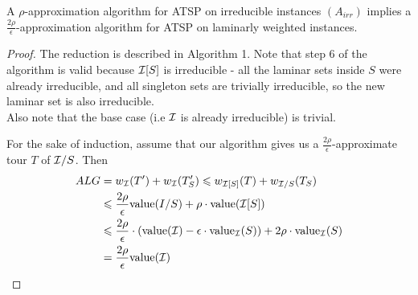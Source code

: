 \documentclass[./main.tex]{subfiles}
\begin{document}
	\begin{theorem}
		A $\rho$-approximation algorithm for ATSP on irreducible instances $(A_{irr})$ implies a $\frac{2\rho}{\epsilon}$-approximation algorithm for ATSP on laminarly weighted instances.
	\end{theorem}
	\begin{proof}
		The reduction is described in Algorithm 1. Note that step 6 of the algorithm is valid because $\mathcal{I}[S]$ is irreducible - all the laminar sets inside $S$ were already irreducible, and all singleton sets are trivially irreducible, so the new laminar set is also irreducible.\\
		Also note that the base case (i.e $\mathcal{I}$ is already irreducible) is trivial.

		For the sake of induction, assume that our algorithm gives us a $\frac{2\rho}{\epsilon}$-approximate tour $T$ of $\mathcal{I}/S$. Then
		\begin{align*}
				ALG &= w_{\mathcal{I}}(T') + w_{\mathcal{I}}(T_S') \leqslant w_{\mathcal{I}[S]}(T) + w_{\mathcal{I}/S}(T_S) \\&\leqslant \frac{2\rho}{\epsilon}\textup{value}(I/S) + \rho\cdot \textup{value}(\mathcal{I}[S])\\
				&\leqslant \frac{2\rho}{\epsilon}\cdot(\textup{value}(\mathcal{I}) - \epsilon\cdot\textup{value}_{\mathcal{I}}(S)) + 2\rho\cdot\textup{value}_{\mathcal{I}}(S)\\
				&= \frac{2\rho}{\epsilon} \textup{value}(\mathcal{I})
		\end{align*}
	\end{proof}
\end{document}
